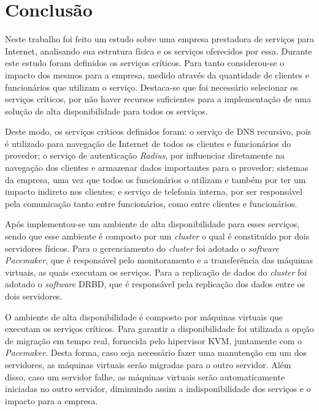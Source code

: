 \chapter{Conclusão}
\label{cap:conclusao}

Neste trabalho foi feito um estudo sobre uma empresa prestadora de serviços para Internet, analisando sua estrutura física e os serviços oferecidos 
por essa. Durante este estudo foram definidos os serviços críticos. Para tanto considerou-se o impacto dos mesmos para a empresa, medido através
da quantidade de clientes e funcionários que utilizam o serviço. Destaca-se que foi necessário selecionar os serviços críticos, por não 
haver recursos suficientes para a implementação de uma solução de alta disponibilidade para todos os serviços.

Deste modo, os serviços críticos definidos foram: o serviço de \ac{DNS} recursivo, pois é utilizado para navegação de Internet de todos os clientes 
e funcionários do provedor; o serviço de autenticação \textit{Radius}, por influenciar diretamente na navegação dos clientes e armazenar dados 
importantes para o provedor; sistemas da empresa, uma vez que todos os funcionários o utilizam e também por ter um impacto indireto nos 
clientes; e serviço de telefonia interna, por ser responsável pela comunicação tanto entre funcionários, como entre clientes e funcionários.

Após implementou-se um ambiente de alta disponibilidade para esses serviços, sendo que esse ambiente é composto por um \textit{cluster} o qual é 
constituído por dois servidores físicos. Para o gerenciamento do \textit{cluster} foi adotado o \textit{software} \textit{Pacemaker}, que é 
responsável pelo monitoramento e a transferência das máquinas virtuais, as quais executam os serviços. Para a replicação de dados 
do \textit{cluster} foi adotado o \textit{software} \ac{DRBD}, que é responsável pela replicação dos dados entre os dois servidores.

O ambiente de alta disponibilidade é composto por máquinas virtuais que executam os serviços críticos. Para garantir a disponibilidade 
foi utilizada a opção de migração em tempo real, fornecida pelo hipervisor \ac{KVM}, juntamente com o \textit{Pacemaker}. Desta forma, 
caso seja necessário fazer uma manutenção em um dos servidores, as máquinas virtuais serão migradas para o outro servidor.
Além disso, caso um servidor falhe, as máquinas virtuais serão automaticamente iniciadas no outro servidor, diminuindo assim a indisponibilidade
dos serviços e o impacto para a empresa.

